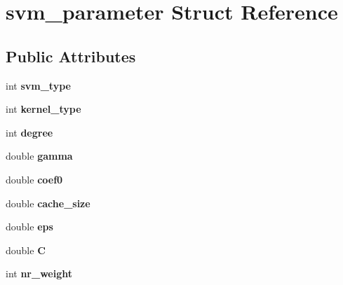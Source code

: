 \hypertarget{structsvm__parameter}{
\section{svm\_\-parameter Struct Reference}
\label{structsvm__parameter}
}
\subsection*{Public Attributes}
\begin{DoxyCompactItemize}
\item 
\hypertarget{structsvm__parameter_a3afb37272180a903df05f7b649b338f4}{
int {\bfseries svm\_\-type}}
\label{structsvm__parameter_a3afb37272180a903df05f7b649b338f4}

\item 
\hypertarget{structsvm__parameter_a4188713ba31fc3d101244a6bcc09a760}{
int {\bfseries kernel\_\-type}}
\label{structsvm__parameter_a4188713ba31fc3d101244a6bcc09a760}

\item 
\hypertarget{structsvm__parameter_afef1c4508ec0045c236a3308b0fa5138}{
int {\bfseries degree}}
\label{structsvm__parameter_afef1c4508ec0045c236a3308b0fa5138}

\item 
\hypertarget{structsvm__parameter_a91667b90506e171482b5fc619377110d}{
double {\bfseries gamma}}
\label{structsvm__parameter_a91667b90506e171482b5fc619377110d}

\item 
\hypertarget{structsvm__parameter_a3ab3555a96a578bea6e5285a5db0a4db}{
double {\bfseries coef0}}
\label{structsvm__parameter_a3ab3555a96a578bea6e5285a5db0a4db}

\item 
\hypertarget{structsvm__parameter_a00286b7e0767e45d68ac7abceb60c821}{
double {\bfseries cache\_\-size}}
\label{structsvm__parameter_a00286b7e0767e45d68ac7abceb60c821}

\item 
\hypertarget{structsvm__parameter_a1feab5a4e0d5842a20e544f3f944f841}{
double {\bfseries eps}}
\label{structsvm__parameter_a1feab5a4e0d5842a20e544f3f944f841}

\item 
\hypertarget{structsvm__parameter_af4f905a3f7d589d86964289af3c9d812}{
double {\bfseries C}}
\label{structsvm__parameter_af4f905a3f7d589d86964289af3c9d812}

\item 
\hypertarget{structsvm__parameter_a44014738d1db5444f7f9a1ebf74e4214}{
int {\bfseries nr\_\-weight}}
\label{structsvm__parameter_a44014738d1db5444f7f9a1ebf74e4214}


\end{DoxyCompactItemize}

